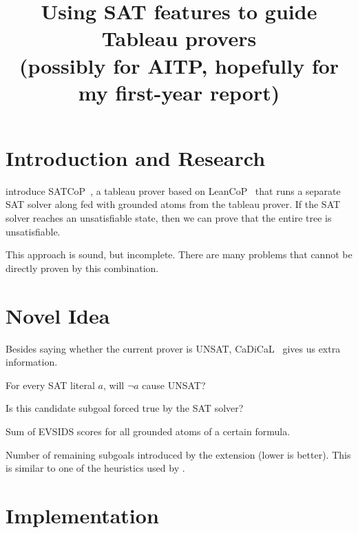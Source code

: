 \documentclass[11pt,twocolumn]{article}
\title{Using SAT features to guide Tableau provers \\[3pt] \large (possibly for AITP, hopefully for my first-year report)}
\date{}
\author{}
\newcommand{\atom}[1]{\colorbox{Gray!30}{\ttfamily #1}}
\newcommand{\citen}[1]{~\parencite{#1}}
\newcommand{\citeay}[1]{\textcite{#1}}
\begin{document}
\twocolumn[
	\centering
	\vspace{1em}
	{\LARGE\bfseries Using SAT features to guide Tableau provers \par} \vspace{3pt}
	{\large (possibly for AITP, hopefully for my first-year report) \par}
	\vspace{2em}
]

\section{Introduction and Research}

\citeauthor{eliminatingModels} introduce SATCoP\citen{eliminatingModels}, a tableau prover based on LeanCoP\citen{Otten2023leanCoP20} that runs a separate SAT solver along fed with grounded atoms from the tableau prover.
If the SAT solver reaches an unsatisfiable state, then we can prove that the entire tree is unsatisfiable.

This approach is sound, but incomplete.
There are many problems that cannot be directly proven by this combination.

\section{Novel Idea}

Besides saying whether the current prover is UNSAT, CaDiCaL\citen{cadical20} gives us extra information.
\begin{description}[style=nextline]
	\item[\atom{probe\_conflicts}] For every SAT literal $a$, will $\neg a$ cause UNSAT?
	\item[\atom{forced\_true}] Is this candidate subgoal forced true by the SAT solver?
	\item[\atom{evsids}] Sum of EVSIDS scores for all grounded atoms of a certain formula.
	\item[\atom{subgoal\_count}] Number of remaining subgoals introduced by the extension (lower is better). This is similar to one of the heuristics used by \citeay{letzModelEliminationConnection2001}.
\end{description}

\section{Implementation}
\end{document}
